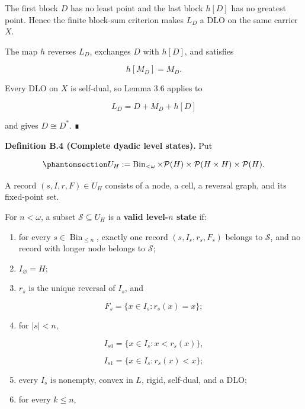 \documentclass[
  english,
  11pt,
  reqno]{amsart}
\newcounter{none} %
\providecommand{\tightlist}{%
  \setlength{\itemsep}{0pt}\setlength{\parskip}{0pt}}
\begin{document}
The first block \(D\) has no least point and the last block \(h[D]\) has
no greatest point. Hence the finite block-sum criterion makes \(L_D\) a
DLO on the same carrier \(X\).

The map \(h\) reverses \(L_D\), exchanges \(D\) with \(h[D]\), and
satisfies

\[
h[M_D]=M_D.
\]

Every DLO on \(X\) is self-dual, so Lemma 3.6 applies to

\[
L_D=D+M_D+h[D]
\]

and gives \(D\cong D^*\). ∎

\protect{}\label{def:b-4-level-state}

\textbf{Definition B.4 (Complete dyadic level states).} Put

\begin{equation}\protect\phantomsection\label{eq:typefree-tree-record-space}{
U_H
:=
\operatorname{Bin}_{<\omega}
\times
\mathcal P(H)
\times
\mathcal P(H\times H)
\times
\mathcal P(H).
}\end{equation}

A record \((s,I,r,F)\in U_H\) consists of a node, a cell, a reversal
graph, and its fixed-point set.

For \(n<\omega\), a subset \(\mathcal S\subseteq U_H\) is a
\textbf{valid level-\(n\) state} if:

\begin{enumerate}
\tightlist
\item
  for every \(s\in\operatorname{Bin}_{\le n}\), exactly one record
  \((s,I_s,r_s,F_s)\) belongs to \(\mathcal S\), and no record with
  longer node belongs to \(\mathcal S\);
\item
  \(I_\varnothing=H\);
\item
  \(r_s\) is the unique reversal of \(I_s\), and
\end{enumerate}

\[
   F_s=\{x\in I_s:r_s(x)=x\};
\]

\begin{enumerate}
\setcounter{enumi}{3}
\tightlist
\item
  for \(|s|<n\),
\end{enumerate}

\[
   I_{s0}=\{x\in I_s:x<r_s(x)\},
\]

\[
   I_{s1}=\{x\in I_s:r_s(x)<x\};
\]

\begin{enumerate}
\setcounter{enumi}{4}
\tightlist
\item
  every \(I_s\) is nonempty, convex in \(L\), rigid, self-dual, and a
  DLO;
\item
  for every \(k\le n\),
\end{enumerate}
\end{document}

